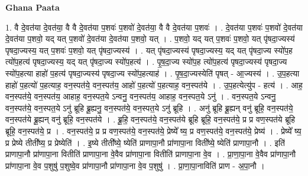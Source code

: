 \documentclass[17pt]{extarticle}
\begin{document}
\textbf{Ghana Paata } \newline

1. वै दे॒वत॑या दे॒वत॑या॒ वै वै दे॒वत॑या प॒शवः॑ प॒शवो॑ दे॒वत॑या॒ वै वै दे॒वत॑या प॒शवः॑ । . दे॒वत॑या प॒शवः॑ प॒शवो॑ दे॒वत॑या दे॒वत॑या प॒शवो॒ यद् यत् प॒शवो॑ दे॒वत॑या दे॒वत॑या प॒शवो॒ यत् । . प॒शवो॒ यद् यत् प॒शवः॑ प॒शवो॒ यत् पृ॑षदा॒ज्यस्य॑ पृषदा॒ज्यस्य॒ यत् प॒शवः॑ प॒शवो॒ यत् पृ॑षदा॒ज्यस्य॑ । . यत् पृ॑षदा॒ज्यस्य॑ पृषदा॒ज्यस्य॒ यद् यत् पृ॑षदा॒ज्य स्यो॑प॒ह त्यो॑प॒हत्य॑ पृषदा॒ज्यस्य॒ यद् यत् पृ॑षदा॒ज्य स्यो॑प॒हत्य॑ । . पृ॒ष॒दा॒ज्य स्यो॑प॒ह त्यो॑प॒हत्य॑ पृषदा॒ज्यस्य॑ पृषदा॒ज्य स्यो॑प॒हत्या हाहो॑ प॒हत्य॑ पृषदा॒ज्यस्य॑ पृषदा॒ज्य स्यो॑प॒हत्याह॑ । . पृ॒ष॒दा॒ज्यस्येति॑ पृषत् - आ॒ज्यस्य॑ । . उ॒प॒हत्या हाहो॑ प॒हत्यो॑ प॒हत्याह॒ वन॒स्पत॑ये॒ वन॒स्पत॑य॒ आहो॑ प॒हत्यो॑ प॒हत्याह॒ वन॒स्पत॑ये । . उ॒प॒हत्येत्यु॑प - हत्य॑ । . आह॒ वन॒स्पत॑ये॒ वन॒स्पत॑य॒ आहाह॒ वन॒स्पत॒ये ऽन्वनु॒ वन॒स्पत॑य॒ आहाह॒ वन॒स्पत॒ये ऽनु॑ । . वन॒स्पत॒ये ऽन्वनु॒ वन॒स्पत॑ये॒ वन॒स्पत॒ये ऽनु॑ ब्रूहि ब्रू॒ह्यनु॒ वन॒स्पत॑ये॒ वन॒स्पत॒ये ऽनु॑ ब्रूहि । . अनु॑ ब्रूहि ब्रू॒ह्यन् वनु॑ ब्रूहि॒ वन॒स्पत॑ये॒ वन॒स्पत॑ये ब्रू॒ह्यन् वनु॑ ब्रूहि॒ वन॒स्पत॑ये । . ब्रू॒हि॒ वन॒स्पत॑ये॒ वन॒स्पत॑ये ब्रूहि ब्रूहि॒ वन॒स्पत॑ये॒ प्र प्र वण॒स्पत॑ये ब्रूहि ब्रूहि॒ वन॒स्पत॑ये॒ प्र । . वन॒स्पत॑ये॒ प्र प्र वण॒स्पत॑ये॒ वन॒स्पत॑ये॒ प्रेष्ये᳚ ष्य॒ प्र वण॒स्पत॑ये॒ वन॒स्पत॑ये॒ प्रेष्य॑ । . प्रेष्ये᳚ ष्य॒ प्र प्रेष्ये तीती᳚ष्य॒ प्र प्रेष्येति॑ । . इ॒ष्ये तीती᳚ष्ये॒ ष्येति॑ प्राणापा॒नौ प्रा॑णापा॒ना विती᳚ष्ये॒ ष्येति॑ प्राणापा॒नौ । . इति॑ प्राणापा॒नौ प्रा॑णापा॒ना वितीति॑ प्राणापा॒ना वे॒वैव प्रा॑णापा॒ना वितीति॑ प्राणापा॒ना वे॒व । . प्रा॒णा॒पा॒ना वे॒वैव प्रा॑णापा॒नौ प्रा॑णापा॒ना वे॒व प॒शुषु॑ प॒शुष्वे॒व प्रा॑णापा॒नौ प्रा॑णापा॒ना वे॒व प॒शुषु॑ । . प्रा॒णा॒पा॒नाविति॑ प्राण - अ॒पा॒नौ । \newline
\end{document}
